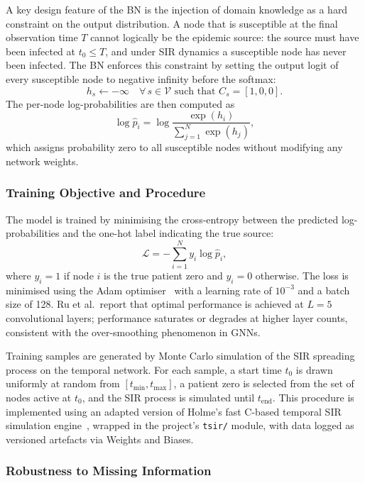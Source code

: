 A key design feature of the BN is the injection of domain knowledge as a hard constraint on the output distribution. A node that is susceptible at the final observation time $T$ cannot logically be the epidemic source: the source must have been infected at $t_0 \leq T$, and under SIR dynamics a susceptible node has never been infected. The BN enforces this constraint by setting the output logit of every susceptible node to negative infinity before the softmax:
\[
    h_s \leftarrow -\infty \quad \forall\, s \in \mathcal{V} \text{ such that } C_s = [1, 0, 0].
\]
The per-node log-probabilities are then computed as
\[
    \log \hat{p}_i = \log \frac{\exp(h_i)}{\sum_{j=1}^{N} \exp(h_j)},
\]
which assigns probability zero to all susceptible nodes without modifying any network weights.

\subsubsection{Training Objective and Procedure}
\label{sssec:bn-training}

The model is trained by minimising the cross-entropy between the predicted log-probabilities and the one-hot label indicating the true source:
\[
    \mathcal{L} = -\sum_{i=1}^{N} y_i \log \hat{p}_i,
\]
where $y_i = 1$ if node $i$ is the true patient zero and $y_i = 0$ otherwise. The loss is minimised using the Adam optimiser~\cite{Kingma2015} with a learning rate of $10^{-3}$ and a batch size of 128. Ru et al.\ report that optimal performance is achieved at $L = 5$ convolutional layers; performance saturates or degrades at higher layer counts, consistent with the over-smoothing phenomenon in GNNs.

Training samples are generated by Monte Carlo simulation of the SIR spreading process on the temporal network. For each sample, a start time $t_0$ is drawn uniformly at random from $[t_{\min}, t_{\max}]$, a patient zero is selected from the set of nodes active at $t_0$, and the SIR process is simulated until $t_{\text{end}}$. This procedure is implemented using an adapted version of Holme's fast C-based temporal SIR simulation engine~\cite{Holme2020}, wrapped in the project's \texttt{tsir/} module, with data logged as versioned artefacts via Weights and Biases.

\subsubsection{Robustness to Missing Information}
\label{sssec:bn-robustness}

